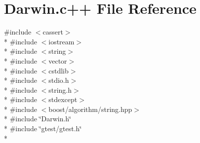 \hypertarget{Darwin_8c_09_09}{\section{Darwin.\-c++ File Reference}
\label{Darwin_8c_09_09}
}
{\ttfamily \#include $<$cassert$>$}\\*
{\ttfamily \#include $<$iostream$>$}\\*
{\ttfamily \#include $<$string$>$}\\*
{\ttfamily \#include $<$vector$>$}\\*
{\ttfamily \#include $<$cstdlib$>$}\\*
{\ttfamily \#include $<$stdio.\-h$>$}\\*
{\ttfamily \#include $<$string.\-h$>$}\\*
{\ttfamily \#include $<$stdexcept$>$}\\*
{\ttfamily \#include $<$boost/algorithm/string.\-hpp$>$}\\*
{\ttfamily \#include \char`\"{}Darwin.\-h\char`\"{}}\\*
{\ttfamily \#include \char`\"{}gtest/gtest.\-h\char`\"{}}\\*
